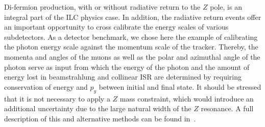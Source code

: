 Di-fermion production, with or without radiative return to the $Z$ pole, is an integral part of the ILC physics case. In addition, the radiative return events offer an important
opportunity to cross calibrate the energy scales of various subdetectors. As a detector benchmark, we chose here the example of calibrating the photon energy scale against the momentum scale of the tracker. Thereby, the momenta and angles of the muons as well as the 
polar and azimuthal angle of the photon serve as input from which the energy of the photon and the amount of energy lost in beamstrahlung and collinear ISR are determined by
requiring conservation of energy and $p_y$ between initial and final state. It should be stressed that it is not necessary to apply a $Z$ mass constraint, which would introduce an additional uncertainty due to the large natural width of the $Z$ resonance. A full description of this and alternative methods can be found in~\cite{ILDNote:gammaZ}.
 

